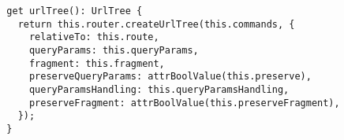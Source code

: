 \begin{verbatim}
  get urlTree(): UrlTree {
    return this.router.createUrlTree(this.commands, {
      relativeTo: this.route,
      queryParams: this.queryParams,
      fragment: this.fragment,
      preserveQueryParams: attrBoolValue(this.preserve),
      queryParamsHandling: this.queryParamsHandling,
      preserveFragment: attrBoolValue(this.preserveFragment),
    });
  }
\end{verbatim}
